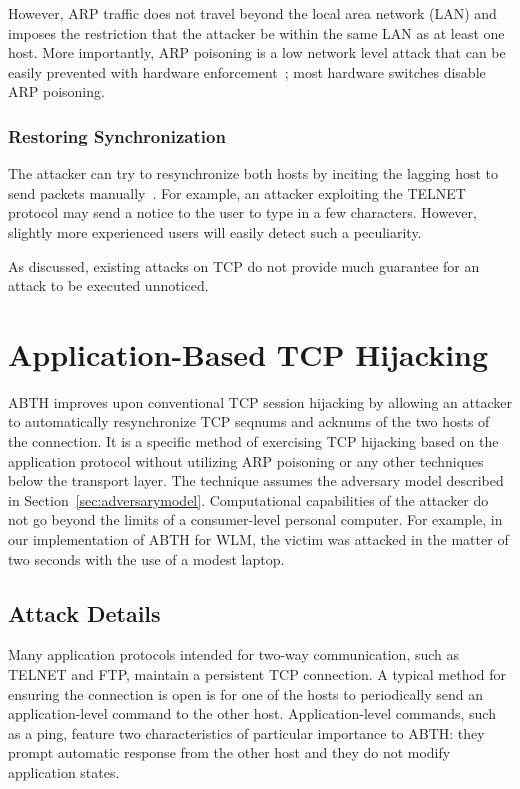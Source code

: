 \documentclass{sig-alternate}
\begin{document}
However, ARP traffic does not travel beyond the local area network (LAN) and imposes the restriction that the attacker be within the same LAN as at least one host.
More importantly, ARP poisoning is a low network level attack that can be easily prevented with hardware enforcement~\cite{spangler:sniffing}; most hardware switches disable ARP poisoning.

\subsubsection{Restoring Synchronization}

The attacker can try to resynchronize both hosts by inciting the lagging host to send packets manually~\cite{lam:resync}.
For example, an attacker exploiting the TELNET protocol may send a notice to the user to type in a few characters.
However, slightly more experienced users will easily detect such a peculiarity.

As discussed, existing attacks on TCP do not provide much guarantee for an attack to be executed unnoticed.

\section{Application-Based TCP Hijacking}
\label{sec:abth}

ABTH improves upon conventional TCP session hijacking by allowing an attacker to automatically resynchronize TCP seqnums and acknums of the two hosts of the connection.
It is a specific method of exercising TCP hijacking based on the application protocol without utilizing ARP poisoning or any other techniques below the transport layer.
The technique assumes the adversary model described in Section~\ref{sec:adversarymodel}. 
Computational capabilities of the attacker do not go beyond the limits of a consumer-level personal computer.
For example, in our implementation of ABTH for WLM, the victim was attacked in the matter of two seconds with the use of a modest laptop.

\subsection{Attack Details}

Many application protocols intended for two-way communication, such as TELNET and FTP, maintain a persistent TCP connection.
A typical method for ensuring the connection is open is for one of the hosts to periodically send an application-level command to the other host.
Application-level commands, such as a ping, feature two characteristics of particular importance to ABTH: they prompt automatic response from the other host and they do not modify application states.
\end{document}
